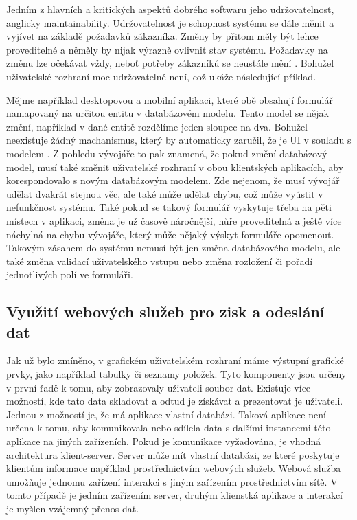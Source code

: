 Jedním z hlavních a kritických aspektů dobrého softwaru jeho udržovatelnost, anglicky maintainability. Udržovatelnost je schopnost systému se dále měnit a vyjívet na základě požadavků zákazníka. Změny by přitom měly být lehce proveditelné a něměly by nijak výrazně ovlivnit stav systému. Požadavky na změnu lze očekávat vždy, neboť potřeby zákazníků se neustále mění \cite{sommerville}. Bohužel uživatelské rozhraní moc udržovatelné není, což ukáže následující příklad.

Mějme například desktopovou a mobilní aplikaci, které obě obsahují formulář namapovaný na určitou entitu v databázovém modelu. Tento model se nějak změní, například v dané entitě rozdělíme jeden sloupec na dva. Bohužel neexistuje žádný machanismus, který by automaticky zaručil, že je UI v souladu s modelem \cite{cernyTEA}. Z pohledu vývojáře to pak znamená, že pokud změní databázový model, musí také změnit uživatelské rozhraní v obou klientských aplikacích, aby korespondovalo s novým databázovým modelem. Zde nejenom, že musí vývojář udělat dvakrát stejnou věc, ale také může udělat chybu, což může vyústit v nefunkčnost systému. Také pokud se takový formulář vyskytuje třeba na pěti místech v aplikaci, změna je už časově náročnější, hůře proveditelná a ještě více náchylná na chybu vývojáře, který může nějaký výskyt formuláře opomenout.
Takovým zásahem do systému nemusí být jen změna databázového modelu, ale také změna validací uživatelského vstupu nebo změna rozložení či pořadí jednotlivých polí ve formuláři.

\subsection{Využití webových služeb pro zisk a odeslání dat}
Jak už bylo zmíněno, v grafickém uživatelském rozhraní máme výstupní grafické prvky, jako například tabulky či seznamy položek. Tyto komponenty jsou určeny v první řadě k tomu, aby zobrazovaly uživateli soubor dat. Existuje více možností, kde tato data skladovat a odtud je získávat a prezentovat je uživateli. Jednou z možností je, že má aplikace vlastní databázi. Taková aplikace není určena k tomu, aby komunikovala nebo sdílela data s dalšími instancemi této aplikace na jiných zařízeních. Pokud je komunikace vyžadována, je vhodná architektura klient-server. Server může mít vlastní databázi, ze které poskytuje klientům informace například prostřednictvím webových služeb. Webová služba umožňuje jednomu zařízení interakci s jiným zařízením prostřednictvím sítě\cite{wiki-ws}. V tomto případě je jedním zařízením server, druhým klienstká aplikace a interakcí je myšlen vzájemný přenos dat. 

